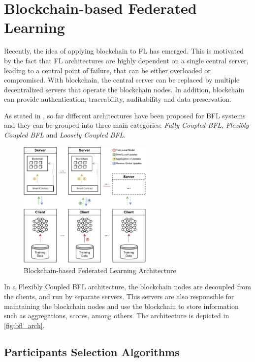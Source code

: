 \section{Blockchain-based Federated Learning}\label{background:bfl}

Recently, the idea of applying blockchain to FL has emerged. This is motivated by the fact that FL architectures are highly dependent on a single central server, leading to a central point of failure, that can be either overloaded or compromised. With blockchain, the central server can be replaced by multiple decentralized servers that operate the blockchain nodes. In addition, blockchain can provide authentication, traceability, auditability and data preservation.

As stated in \cite{10.48550/arxiv.2110.02182}, so far different architectures have been proposed for BFL systems and they can be grouped into three main categories: \textit{Fully Coupled BFL}, \textit{Flexibly Coupled BFL} and \textit{Loosely Coupled BFL}.

\begin{figure}[!ht]
    \centering
    \centering
    \includegraphics[width=0.6\textwidth]{graphics/bfl-architecture.pdf}
    \caption{Blockchain-based Federated Learning Architecture}
    \label{fig:bfl_arch}
\end{figure}

In a Flexibly Coupled BFL architecture, the blockchain nodes are decoupled from the clients, and run by separate servers. This servers are also responsible for maintaining the blockchain nodes and use the blockchain to store information such as aggregations, scores, among others. The architecture is depicted in \autoref{fig:bfl_arch}.

\subsection{Participants Selection Algorithms}

